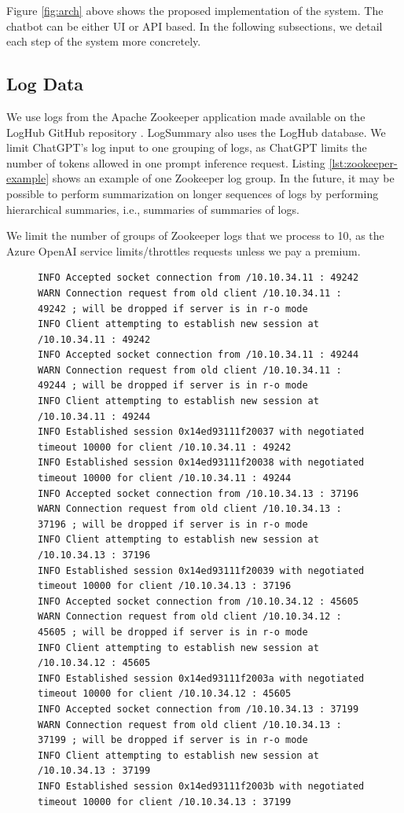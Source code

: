 \documentclass[conference]{IEEEtran}
\begin{document}
Figure \ref{fig:arch} above shows the proposed implementation of the system. The chatbot can be either UI or API based. In the following subsections, we detail each step of the system more concretely.

\subsection{Log Data}

We use logs from the Apache Zookeeper \cite{zookeeper} application made available on the LogHub GitHub repository \cite{zhu2023loghub}. LogSummary \cite{10017337} also uses the LogHub database. We limit ChatGPT's log input to one grouping of logs, as ChatGPT limits the number of tokens allowed in one prompt inference request. \cite{zhoudb} Listing \ref{lst:zookeeper-example} shows an example of one Zookeeper log group. In the future, it may be possible to perform summarization on longer sequences of logs by performing hierarchical summaries, i.e., summaries of summaries of logs.

We limit the number of groups of Zookeeper logs that we process to 10, as the Azure OpenAI service limits/throttles requests unless we pay a premium.

\begin{figure}[ht]
\begin{lstlisting}[numbers=none, caption=Zookeeper Log Example, label={lst:zookeeper-example}]
INFO Accepted socket connection from /10.10.34.11 : 49242
WARN Connection request from old client /10.10.34.11 : 49242 ; will be dropped if server is in r-o mode
INFO Client attempting to establish new session at /10.10.34.11 : 49242
INFO Accepted socket connection from /10.10.34.11 : 49244
WARN Connection request from old client /10.10.34.11 : 49244 ; will be dropped if server is in r-o mode
INFO Client attempting to establish new session at /10.10.34.11 : 49244
INFO Established session 0x14ed93111f20037 with negotiated timeout 10000 for client /10.10.34.11 : 49242
INFO Established session 0x14ed93111f20038 with negotiated timeout 10000 for client /10.10.34.11 : 49244
INFO Accepted socket connection from /10.10.34.13 : 37196
WARN Connection request from old client /10.10.34.13 : 37196 ; will be dropped if server is in r-o mode
INFO Client attempting to establish new session at /10.10.34.13 : 37196
INFO Established session 0x14ed93111f20039 with negotiated timeout 10000 for client /10.10.34.13 : 37196
INFO Accepted socket connection from /10.10.34.12 : 45605
WARN Connection request from old client /10.10.34.12 : 45605 ; will be dropped if server is in r-o mode
INFO Client attempting to establish new session at /10.10.34.12 : 45605
INFO Established session 0x14ed93111f2003a with negotiated timeout 10000 for client /10.10.34.12 : 45605
INFO Accepted socket connection from /10.10.34.13 : 37199
WARN Connection request from old client /10.10.34.13 : 37199 ; will be dropped if server is in r-o mode
INFO Client attempting to establish new session at /10.10.34.13 : 37199
INFO Established session 0x14ed93111f2003b with negotiated timeout 10000 for client /10.10.34.13 : 37199
\end{lstlisting}
\end{figure} 
\end{document}
